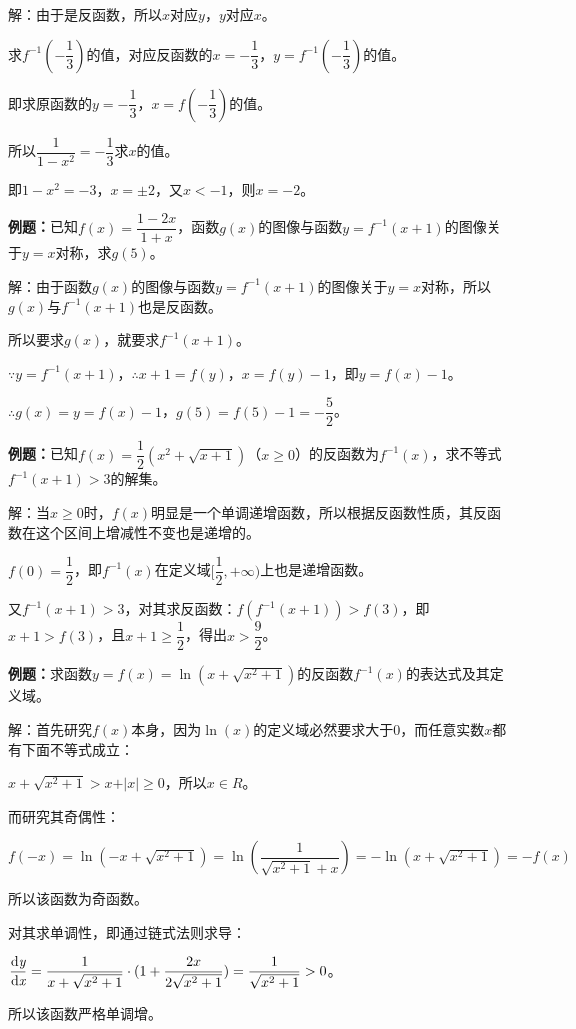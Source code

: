\documentclass[UTF8, 12pt]{ctexart}
\begin{document}
解：由于是反函数，所以$x$对应$y$，$y$对应$x$。

求$f^{-1}(-\dfrac{1}{3})$的值，对应反函数的$x=-\dfrac{1}{3}$，$y=f^{-1}(-\dfrac{1}{3})$的值。

即求原函数的$y=-\dfrac{1}{3}$，$x=f(-\dfrac{1}{3})$的值。

所以$\dfrac{1}{1-x^2}=-\dfrac{1}{3}$求$x$的值。

即$1-x^2=-3$，$x=\pm2$，又$x<-1$，则$x=-2$。

\textbf{例题：}已知$f(x)=\dfrac{1-2x}{1+x}$，函数$g(x)$的图像与函数$y=f^{-1}(x+1)$的图像关于$y=x$对称，求$g(5)$。

解：由于函数$g(x)$的图像与函数$y=f^{-1}(x+1)$的图像关于$y=x$对称，所以$g(x)$与$f^{-1}(x+1)$也是反函数。

所以要求$g(x)$，就要求$f^{-1}(x+1)$。

$\because y=f^{-1}(x+1)$，$\therefore x+1=f(y)$，$x=f(y)-1$，即$y=f(x)-1$。

$\therefore g(x)=y=f(x)-1$，$g(5)=f(5)-1=-\dfrac{5}{2}$。

\textbf{例题：}已知$f(x)=\dfrac{1}{2}(x^2+\sqrt{x+1})$（$x\geqslant0$）的反函数为$f^{-1}(x)$，求不等式$f^{-1}(x+1)>3$的解集。

解：当$x\geqslant0$时，$f(x)$明显是一个单调递增函数，所以根据反函数性质，其反函数在这个区间上增减性不变也是递增的。

$f(0)=\dfrac{1}{2}$，即$f^{-1}(x)$在定义域$[\dfrac{1}{2},+\infty)$上也是递增函数。

又$f^{-1}(x+1)>3$，对其求反函数：$f(f^{-1}(x+1))>f(3)$，即$x+1>f(3)$，且$x+1\geqslant\dfrac{1}{2}$，得出$x>\dfrac{9}{2}$。

\textbf{例题：}求函数$y=f(x)=\ln(x+\sqrt{x^2+1})$的反函数$f^{-1}(x)$的表达式及其定义域。

解：首先研究$f(x)$本身，因为$\ln(x)$的定义域必然要求大于0，而任意实数$x$都有下面不等式成立：

$x+\sqrt{x^2+1}>x+\vert x\vert \geqslant 0$，所以$x\in R$。

而研究其奇偶性：

$f(-x)=\ln(-x+\sqrt{x^2+1})=\ln(\dfrac{1}{\sqrt{x^2+1}+x})=-\ln(x+\sqrt{x^2+1})=-f(x)$

所以该函数为奇函数。

对其求单调性，即通过链式法则求导：

$\dfrac{\rm{d}\textit{y}}{\rm{d}\textit{x}}=\dfrac{1}{x+\sqrt{x^2+1}}\cdot (1+\dfrac{2x}{2\sqrt{x^2+1}})=\dfrac{1}{\sqrt{x^2+1}}>0$。\medskip

所以该函数严格单调增。
\end{document}
